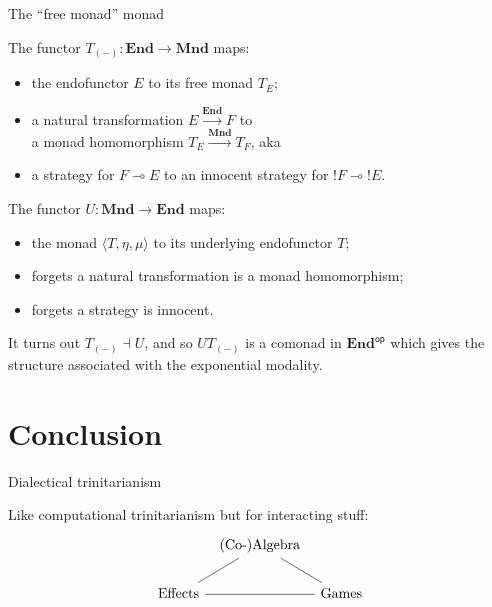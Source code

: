 \documentclass{beamer}
\begin{document}
\begin{frame}{The ``free monad'' monad} %

  The functor $T_{(-)} : \mathbf{End} \rightarrow \mathbf{Mnd}$ maps:
  \begin{itemize}
    \item the endofunctor $E$ to its free monad $T_E$;
    \item a natural transformation $E \xrightarrow{\mathbf{End}} F$ to \\
      a monad homomorphism $T_E \xrightarrow{\mathbf{Mnd}} T_F$, aka
    \item a strategy for $F \multimap E$ to
      an innocent strategy for ${!F} \multimap {!E}$.
  \end{itemize}

  The functor $U : \mathbf{Mnd} \rightarrow \mathbf{End}$ maps:
  \begin{itemize}
    \item the monad $\langle T, \eta, \mu \rangle$
      to its underlying endofunctor $T$;
    \item forgets a natural transformation is a monad homomorphism;
    \item forgets a strategy is innocent.
  \end{itemize}

  It turns out $T_{(-)} \dashv U$,
  and so $U T_{(-)}$ is a comonad in $\mathbf{End}^\mathsf{op}$
  which gives the structure associated with the exponential modality.

\end{frame}

\section{Conclusion}
\frame{\sectionpage}

\begin{frame}[fragile]{Dialectical trinitarianism} %

  Like computational trinitarianism but for interacting stuff:
  \[
    \begin{tikzcd}[column sep=tiny]
      & \text{(Co-)Algebra} \ar[dl, dash] \ar[dr, dash] & \\
      \text{Effects} \ar[rr, dash] & &
      \text{Games}
    \end{tikzcd}
  \]

\end{frame}
\end{document}
